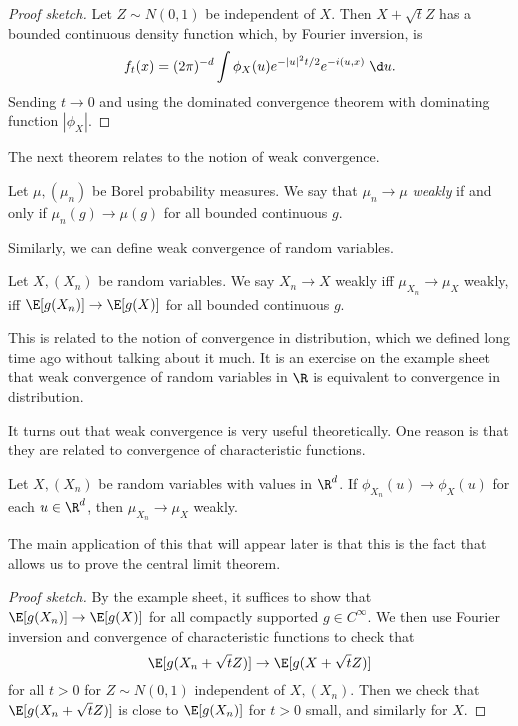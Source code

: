 \documentclass[a4paper]{article}
\begin{document}
\begin{proof}[Proof sketch]
  Let $Z \sim N(0, 1)$ be independent of $X$. Then $X + \sqrt{t} Z$ has a bounded continuous density function which, by Fourier inversion, is
  \[
    f_t(x) = (2\pi)^{-d} \int \phi_X(u) e^{-|u|^2 t / 2} e^{-i(u, x)}\;\d u.
  \]
  Sending $t \to 0$ and using the dominated convergence theorem with dominating function $|\phi_X|$.
\end{proof}

The next theorem relates to the notion of weak convergence.
\begin{defi}
  Let $\mu, (\mu_n)$ be Borel probability measures. We say that $\mu_n \to \mu$ \emph{weakly} if and only if $\mu_n(g) \to \mu(g)$ for all bounded continuous $g$.
\end{defi}

Similarly, we can define weak convergence of random variables.

\begin{defi}
  Let $X, (X_n)$ be random variables. We say $X_n \to X$ weakly iff $\mu_{X_n} \to \mu_X$ weakly, iff $\E[g(X_n)] \to \E[g(X)]$ for all bounded continuous $g$.
\end{defi}

This is related to the notion of convergence in distribution, which we defined long time ago without talking about it much. It is an exercise on the example sheet that weak convergence of random variables in $\R$ is equivalent to convergence in distribution.

It turns out that weak convergence is very useful theoretically. One reason is that they are related to convergence of characteristic functions.
\begin{thm}
  Let $X, (X_n)$ be random variables with values in $\R^d$. If $\phi_{X_n}(u) \to \phi_X(u)$ for each $u \in \R^d$, then $\mu_{X_n} \to \mu_X$ weakly.
\end{thm}

The main application of this that will appear later is that this is the fact that allows us to prove the central limit theorem.

\begin{proof}[Proof sketch]
  By the example sheet, it suffices to show that $\E[g(X_n)] \to \E[g(X)]$ for all compactly supported $g \in C^\infty$. We then use Fourier inversion and convergence of characteristic functions to check that
  \[
    \E[g(X_n + \sqrt{t}Z)] \to \E[g(X + \sqrt{t}Z)]
  \]
  for all $t > 0$ for $Z\sim N(0, 1)$ independent of $X, (X_n)$. Then we check that $\E[g(X_n + \sqrt{t}Z)]$ is close to $\E[g(X_n)]$ for $t > 0$ small, and similarly for $X$.
\end{proof}
\end{document}
